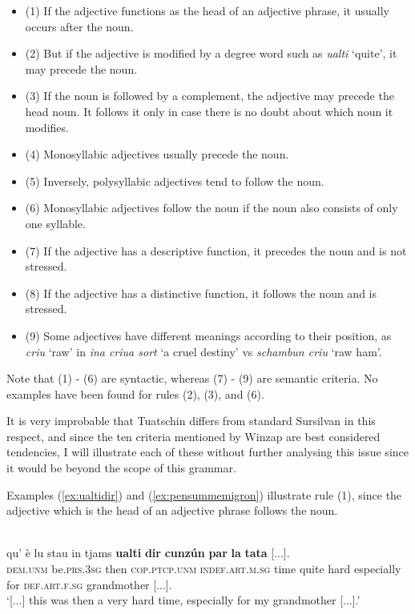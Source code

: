 \begin{itemize}
\item (1) If the adjective functions as the head of an adjective phrase, it usually occurs after the noun.
\item (2) But if the adjective is modified by a degree word such as \textit{ualti} `quite', it may precede the noun.
\item (3) If the noun is followed by a complement, the adjective may precede the head noun. It follows it only in case there is no doubt about which noun it modifies.
\item (4) Monosyllabic adjectives usually precede the noun.
\item (5) Inversely, polysyllabic adjectives tend to follow the noun.
\item (6) Monosyllabic adjectives follow the noun if the noun also consists of only one syllable.
\item (7) If the adjective has a descriptive function, it precedes the noun and is not stressed.
\item (8) If the adjective has a distinctive function, it follows the noun and is stressed.
\item (9) Some adjectives have different meanings according to their position, as \textit{criu} `raw' in \textit{ina criua sort} `a cruel destiny' vs \textit{schambun criu} `raw ham'.
\end{itemize}	

Note that (1) - (6) are syntactic, whereas (7) - (9) are semantic criteria. No examples have been found for rules (2), (3), and (6).

It is very improbable that Tuatschin differs from standard Sursilvan in this respect, and since the ten criteria mentioned by Winzap are best considered tendencies, I will illustrate each of these without further analysing this issue since it would be beyond the scope of this grammar.

Examples (\ref{ex:ualtidir}) and (\ref{ex:pensummemigron}) illustrate rule (1), since the adjective which is the head of an adjective phrase follows the noun.
 
\ea
\label{ex:ualtidir}
\\
\gll  [...] qu’ è lu stau in tjams \textbf{ualti} \textbf{dir} \textbf{cunzún} \textbf{par} \textbf{la} \textbf{tata} [...]. \\
{} \textsc{dem.unm} be.\textsc{prs.3sg} then \textsc{cop.ptcp.unm} \textsc{indef.art.m.sg} time quite hard especially for \textsc{def.art.f.sg} grandmother [...].\\
\glt `[...] this was then a very hard time, especially for my grandmother [...].'
\z

